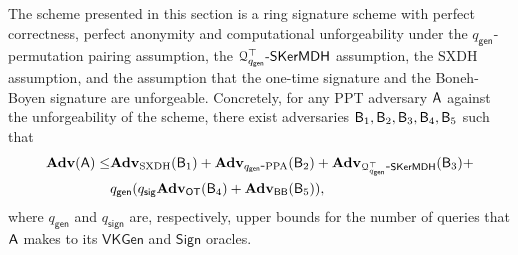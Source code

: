 \begin{theorem}\label{theo:security}
The scheme presented in this section is a ring signature scheme
with perfect correctness, perfect anonymity and computational unforgeability under the
$q_\mathsf{gen}$-permutation pairing assumption, the $\mathcal{Q}_{q_\mathsf{gen}}^\top\mbox{-}\mathsf{SKerMDH}$ assumption, the $\mathrm{SXDH}$ assumption, and the assumption
that the one-time signature and the Boneh-Boyen signature are unforgeable.
Concretely, for any PPT adversary $\mathsf{A}$ against the unforgeability of the scheme, there exist adversaries $\mathsf{B}_1,\mathsf{B}_2,\mathsf{B}_3,\mathsf{B}_4,\mathsf{B}_5$ such that
\begin{align*}
\mathbf{Adv}(\mathsf{A})\leq &\mathbf{Adv}_{\mathrm{SXDH}}(\mathsf{B}_1)+\mathbf{Adv}_{q_\mathsf{gen}\mbox{-}\mathrm{PPA}}(\mathsf{B}_2)+\mathbf{Adv}_{\mathcal{Q}^\top_{q_\mathsf{gen}}\mbox{-}\mathsf{SKerMDH}}(\mathsf{B}_3)+\\
&q_\mathsf{gen}(q_\mathsf{sig}\mathbf{Adv}_{\mathsf{OT}}(\mathsf{B}_4)+\mathbf{Adv}_{\mathsf{BB}}(\mathsf{B}_5)),
\end{align*}
where $q_\mathsf{gen}$ and $q_\mathsf{sign}$ are, respectively, upper bounds for the number of queries that $\mathsf{A}$ makes to its $\mathsf{VKGen}$ and $\mathsf{Sign}$ oracles.
\end{theorem}